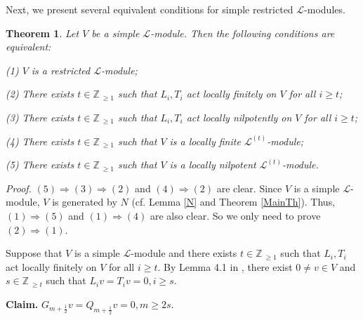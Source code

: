 \documentclass[12pt]{article}
\def\ssc{\scriptscriptstyle}
\def\Z{\mathbb{Z}{\ssc\,}}
\numberwithin{equation}{section}
\newtheorem{theo}{Theorem}[section]
\begin{document}
Next, we present several equivalent conditions for   simple restricted $\mathcal{L}$-modules.
\begin{theo}\label{local}
Let $V$ be a simple $\mathcal{L}$-module. Then the following conditions are equivalent:

{\rm (1)} $V$ is a restricted $\mathcal{L}$-module;

{\rm (2)} There exists $t\in\Z_{\ge 1}$ such that  $L_i,T_i$  act locally finitely on $V$ for all $i\ge t$;

{\rm (3)} There exists $t\in\Z_{\ge 1}$ such that  $L_i,T_i$ act locally nilpotently on $V$ for all $i\ge t$;

{\rm (4)} There exists $t\in\Z_{\ge 1}$ such that $V$ is a locally finite $\mathcal{L}^{(t)}$-module;

{\rm (5)} There exists $t\in\Z_{\ge 1}$ such that $V$ is a locally nilpotent $\mathcal{L}^{(t)}$-module.


\end{theo}
{\it Proof.} $(5)\Rightarrow (3)\Rightarrow (2)$ and  $(4)\Rightarrow (2)$ are clear.
Since $V$ is a simple $\mathcal{L}$-module, $V$ is generated by $N$ (cf. Lemma \ref{N} and Theorem \ref{MainTh}).  Thus, $(1)\Rightarrow (5)$ and  $(1)\Rightarrow (4)$ are  also clear.   So we only need to  prove $(2)\Rightarrow (1)$.

Suppose that $V$ is a simple $\mathcal{L}$-module and there exists $t\in\Z_{\ge 1}$ such that $L_i,T_i$  act locally finitely on $V$ for all $i\ge t$.  By Lemma 4.1 in \cite{G}, there exist
$0\ne v\in V$ and $s\in\Z_{\ge t}$ such that $L_iv=T_iv=0, i\ge s.$

{\bf Claim.}  $G_{m+\frac{1}{2}}v=Q_{m+\frac{1}{2}}v=0, m\ge 2s.$
\end{document}
